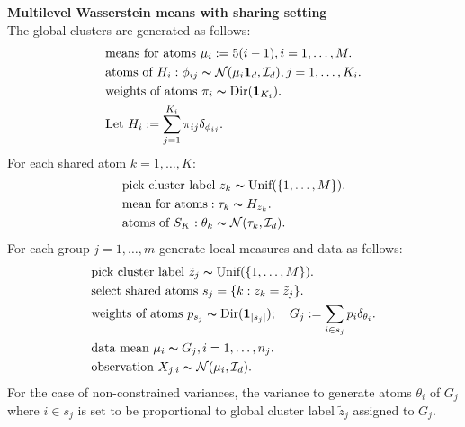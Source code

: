 \textbf{Multilevel Wasserstein means with sharing setting}\\
The global clusters are generated as follows:
\begin{eqnarray*}
\left.\begin{aligned}
& \text{means for atoms } \mu_i := 5(i-1), i=1,\ldots, M.\\
& \text{atoms of } H_i: \phi_{ij} \thicksim \mathcal{N}(\mu_i \vec{1}_d, \mathcal{I}_d), j=1,\ldots, K_i.\\
& \text{weights of atoms } \pi_i \thicksim \text{Dir}(\vec{1}_{K_i}).\\
& \text{Let }
H_i := \sum_{j=1}^{K_i} \pi_{ij}\delta_{\phi_{ij}}. \\
\end{aligned}\right.
\end{eqnarray*}
For each shared atom $k=1,\ldots,K$:
\begin{eqnarray*}
\left.\begin{aligned}
& \text{pick cluster label } z_k \thicksim \text{Unif}( \{1,\ldots ,M \}).\\
& \text{mean for atoms}: \tau_k \thicksim H_{z_k}.\\
& \text{atoms of } S_K: \theta_k \thicksim \mathcal{N}(\tau_k,\mathcal{I}_d).
\end{aligned}\right.
\end{eqnarray*}
For each group $j=1,\ldots,m$ generate local measures and data as follows:
\begin{eqnarray*}
\left.\begin{aligned}
& \text{pick cluster label } \tilde z_j \thicksim \text{Unif}( \{1,\ldots ,M \}).\\
& \text{select shared atoms } s_j = \{k:z_k=\tilde z_j\}.\\
& \text{weights of atoms } p_{s_j} \thicksim \text{Dir}(\vec{1}_{|s_j|});
\quad
G_j := \sum_{i \in s_j} p_{i}\delta_{\theta_{i}}.\\
& \text{data mean } \mu_i \thicksim G_j, i=1,\ldots,n_j.\\
& \text{observation } X_{j,i} \thicksim \mathcal{N}(\mu_i,\mathcal{I}_d).
\end{aligned}\right.
\end{eqnarray*}
For the case of non-constrained variances, the variance to generate atoms $\theta_{i}$ of $G_{j}$ where $i \in s_{j}$ is set to be proportional to global cluster label $\tilde z_{j}$ assigned to $G_{j}$.



